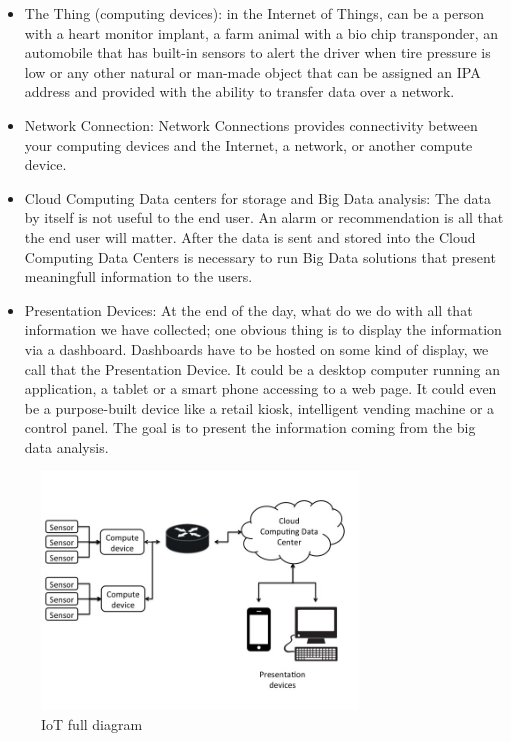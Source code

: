 \begin{itemize} 

\item The Thing (computing devices):  in the Internet of Things, can be a
person with a heart monitor implant, a farm animal with a bio chip transponder,
an automobile that has built-in sensors to alert the driver when tire pressure
is low or any other natural or man-made object that can be assigned an IPA
address and provided with the ability to transfer data over a network.

\item Network Connection: Network Connections provides connectivity between
your computing devices  and the Internet, a network, or another compute device.

\item Cloud Computing Data centers for storage and Big Data analysis: The data
by itself is not useful to the end user. An alarm or recommendation is all that
the end user will matter. After the data is sent and stored into the Cloud
Computing Data Centers is necessary to run Big Data solutions that present
meaningfull information to the users.

\item Presentation Devices: At the end of the day, what do we do with all that
information we have collected; one obvious thing is to display the information
via a dashboard. Dashboards have to be hosted on some kind of display, we call
that the Presentation Device.  It could be a desktop computer running an
application, a tablet or a smart phone accessing to a web page. It could even
be a purpose-built device like a retail kiosk, intelligent vending machine or a
control panel. The goal is to present the information coming from the big data
analysis.

\end{itemize}

\begin{figure}[H]
\centering
\includegraphics[width=0.75\textwidth]{images/IoT_diagram.jpg}
\caption{IoT full diagram }
\label{fig:1.1}
\end{figure}

